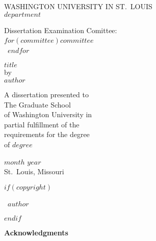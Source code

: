 \documentclass[12pt, oneside, openany]{book}
\begin{document}
\pagestyle{plain}

\frontmatter

\clearpage
\thispagestyle{empty}
\singlespacing
\begin{center}
    WASHINGTON UNIVERSITY IN ST.~LOUIS\\[\baselineskip]

    $department$

    \vfill

    Dissertation Examination Comittee:\\
    $for(committee)$$committee$~\\~$endfor$

    \vfill

    $title$\\
    by\\
    $author$

    \vfill

    A dissertation presented to\\
    The Graduate School\\
    of Washington University in\\
    partial fulfillment of the\\
    requirements for the degree\\
    of $degree$

    \vfill

    $month$ $year$\\
    St.~Louis, Missouri
\end{center}
\clearpage

$if(copyright)$
    \thispagestyle{empty}
    \null
    \vfill
    \begin{center}
        \textcopyright\ $author$
    \end{center}
    \vfill
    \clearpage
$endif$

\setcounter{page}{2}
\tableofcontents
\clearpage
{}
\listoffigures
\clearpage
{}
\listoftables

\clearpage
\doublespacing
{}
\begin{center}
    \textbf{\Huge Acknowledgments}
\end{center}
    
\end{document}
